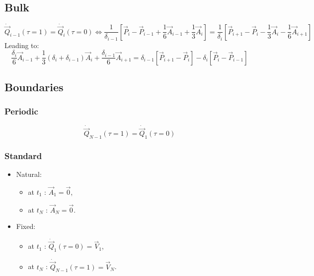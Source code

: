 \documentclass[aps,onecolumn]{revtex4}
\begin{document}
\subsection{Bulk}
\begin{equation}
\dot{\vec{Q}}_{i-1}(\tau=1) =  \dot{\vec{Q}}_i(\tau=0) \Leftrightarrow 
\dfrac{1}{\delta_{i-1}} \left[ \vec{P}_{i} - \vec{P}_{i-1} + \dfrac{1}{6}\vec{A}_{i-1} + \dfrac{1}{3} \vec{A}_{i}\right]
 = 
\dfrac{1}{\delta_i} \left[ \vec{P}_{i+1} - \vec{P}_i - \dfrac{1}{3}\vec{A}_i - \dfrac{1}{6} \vec{A}_{i+1}\right]
\end{equation}
Leading to:
\begin{equation}
	\dfrac{\delta_i}{6} \vec{A}_{i-1} + \dfrac{1}{3} \left(\delta_i + \delta_{i-1} \right) \vec{A}_i + \dfrac{\delta_{i-1}}{6} \vec{A}_{i+1} =
	\delta_{i-1} \left[ \vec{P}_{i+1} - \vec{P}_i \right] - \delta_i \left[ \vec{P}_i - \vec{P}_{i-1}\right ]
\end{equation}

\subsection{Boundaries}

\subsubsection{Periodic}
\begin{equation}
\dot{\vec{Q}}_{N-1}(\tau=1) =  \dot{\vec{Q}}_1(\tau=0)
\end{equation}

\subsubsection{Standard}

\begin{itemize}
\item Natural:
	\begin{itemize}
	\item at $t_1$ : $\vec{A}_1=\vec{0}$,
	\item at $t_N$ : $\vec{A}_N=\vec{0}$.
	\end{itemize}
\item Fixed:
	\begin{itemize}
	\item at $t_1$ : $\dot{\vec{Q}}_1(\tau=0) = \vec{V}_1$,
	\item at $t_N$ : $\dot{\vec{Q}}_{N-1}(\tau=1) = \vec{V}_N$.
	\end{itemize}	
	
\end{itemize}
\end{document}
